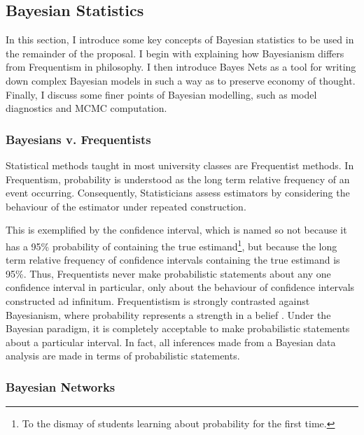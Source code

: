 \subsection{Bayesian Statistics}

In this section, I introduce some key concepts of Bayesian statistics to be used in the remainder of the proposal.  I begin with explaining how Bayesianism differs from Frequentism in philosophy.  I then introduce Bayes Nets as a tool for writing down complex Bayesian models in such a way as to preserve economy of thought.  Finally, I discuss some finer points of Bayesian modelling, such as model diagnostics and MCMC computation.


\subsubsection{Bayesians v. Frequentists}

Statistical methods taught in most  university classes are Frequentist methods.  In Frequentism, probability is understood as the long term relative frequency of an event occurring.  Consequently, Statisticians assess estimators by considering the behaviour of the estimator under repeated construction.  

This is exemplified by the confidence interval, which is named so not because it has a 95\% probability of containing the true estimand\footnote{To the dismay of students learning about probability for the first time.}, but because the long term relative frequency of confidence intervals containing the true estimand is 95\%.  Thus, Frequentists never make probabilistic statements about any one confidence interval in particular, only about the behaviour of confidence intervals constructed ad infinitum.  Frequentistism is strongly contrasted against Bayesianism, where probability represents a strength in a belief \cite{gelman2013bayesian}.  Under the Bayesian paradigm, it is completely acceptable to make probabilistic statements about a particular interval.  In fact, all inferences made from a Bayesian data analysis are made in terms of probabilistic statements.


\subsubsection{Bayesian Networks}

